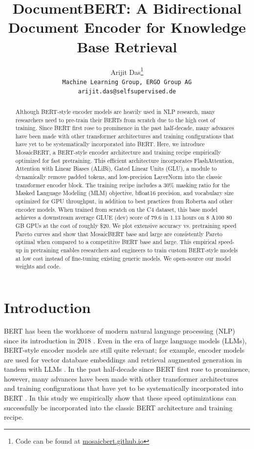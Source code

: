 \documentclass{article}
\title{DocumentBERT: A Bidirectional Document Encoder for Knowledge Base Retrieval}
\author{%
  Arijit Das\thanks{Code can be found at \href{https://mosaicbert.github.io}{\url{mosaicbert.github.io}}} \\
  \texttt{Machine Learning Group, ERGO Group AG}\\
  \texttt{arijit.das@selfsupervised.de}\\
}
\begin{document}
\maketitle

\begin{abstract}
    Although BERT-style encoder models are heavily used in NLP research, many researchers need to pre-train their BERTs from scratch due to the high cost of training.
    Since BERT first rose to prominence in the past half-decade, many advances have been made with other transformer architectures and training configurations that have yet to be systematically incorporated into BERT.
    Here, we introduce MosaicBERT, a BERT-style encoder architecture and training recipe empirically optimized for fast pretraining.
    This efficient architecture incorporates FlashAttention, Attention with Linear Biases (ALiBi), Gated Linear Units (GLU), a module to dynamically remove padded tokens, and low-precision LayerNorm into the classic transformer encoder block.
    The training recipe includes a 30\% masking ratio for the Masked Language Modeling (MLM) objective, bfloat16 precision, and vocabulary size optimized for GPU throughput, in addition to best practices from Roberta and other encoder models.
    When trained from scratch on the C4 dataset, this base model achieves a downstream average GLUE (dev) score of 79.6 in 1.13 hours on 8 A100 80 GB GPUs at the cost of roughly \$20.
    We plot extensive accuracy vs. pretraining speed Pareto curves and show that MosaicBERT base and large are consistently Pareto optimal when compared to a competitive BERT base and large.
    This empirical speed-up in pretraining enables researchers and engineers to train custom BERT-style models at low cost instead of fine-tuning existing generic models. 
    We open-source our model weights and code.
\end{abstract}



\section{Introduction}


BERT has been the workhorse of modern natural language processing (NLP) since its introduction in 2018 \citep{devlin2018bert}. 
Even in the era of large language models (LLMs), BERT-style encoder models are still quite relevant; for example, encoder models are used for vector database embeddings and retrieval augmented generation in tandem with LLMs \citep{karpukhin2020dense,lewis2020retrieval,izacard2022unsupervised,wang2022text,shi2023replug}.
In the past half-decade since BERT first rose to prominence, however, many advances have been made with other transformer architectures and training configurations that have yet to be systematically incorporated into BERT \citep{dauphin2017language,press2021train,dao2022flashattention}. In this study we empirically show that these speed optimizations can successfully be incorporated into the classic BERT architecture and training recipe.
\end{document}
